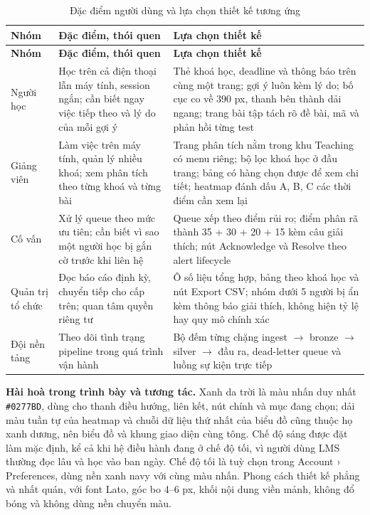{\small
\begin{longtable}{@{}L{2.0cm}L{5.4cm}L{7.4cm}@{}}
\caption{Đặc điểm người dùng và lựa chọn thiết kế tương ứng}\label{tab:ui-users}\\
\toprule
\textbf{Nhóm} & \textbf{Đặc điểm, thói quen} & \textbf{Lựa chọn thiết kế} \\
\midrule
\endfirsthead
\toprule
\textbf{Nhóm} & \textbf{Đặc điểm, thói quen} & \textbf{Lựa chọn thiết kế} \\
\midrule
\endhead
Người học & Học trên cả điện thoại lẫn máy tính, session ngắn; cần biết ngay việc tiếp theo và lý do của mỗi gợi ý & Thẻ khoá học, deadline và thông báo trên cùng một trang; gợi ý luôn kèm lý do; bố cục co về 390 px, thanh bên thành dải ngang; trang bài tập tách rõ đề bài, mã và phản hồi từng test \\
Giảng viên & Làm việc trên máy tính, quản lý nhiều khoá; xem phân tích theo từng khoá và từng bài & Trang phân tích nằm trong khu Teaching có menu riêng; bộ lọc khoá học ở đầu trang; bảng có hàng chọn được để xem chi tiết; heatmap đánh dấu A, B, C các thời điểm cần xem lại \\
Cố vấn & Xử lý queue theo mức ưu tiên; cần biết vì sao một người học bị gắn cờ trước khi liên hệ & Queue xếp theo điểm rủi ro; điểm phân rã thành 35 + 30 + 20 + 15 kèm câu giải thích; nút Acknowledge và Resolve theo alert lifecycle \\
Quản trị tổ chức & Đọc báo cáo định kỳ, chuyển tiếp cho cấp trên; quan tâm quyền riêng tư & Ô số liệu tổng hợp, bảng theo khoá học và nút Export CSV; nhóm dưới 5 người bị ẩn kèm thông báo giải thích, không hiện tỷ lệ hay quy mô chính xác \\
Đội nền tảng & Theo dõi tình trạng pipeline trong quá trình vận hành & Bộ đếm từng chặng ingest $\rightarrow$ bronze $\rightarrow$ silver $\rightarrow$ đầu ra, dead-letter queue và luồng sự kiện trực tiếp \\
\bottomrule
\end{longtable}}

\textbf{Hài hoà trong trình bày và tương tác.} Xanh da trời là màu nhấn duy nhất \texttt{\#0277BD}, dùng cho thanh điều hướng, liên kết, nút chính và mục đang chọn; dải màu tuần tự của heatmap và chuỗi dữ liệu thứ nhất của biểu đồ cũng thuộc họ xanh dương, nên biểu đồ và khung giao diện cùng tông. Chế độ sáng được đặt làm mặc định, kể cả khi hệ điều hành đang ở chế độ tối, vì người dùng LMS thường đọc lâu và học vào ban ngày. Chế độ tối là tuỳ chọn trong Account › Preferences, dùng nền xanh navy với cùng màu nhấn. Phong cách thiết kế phẳng và nhất quán, với font Lato, góc bo 4--6 px, khối nội dung viền mảnh, không đổ bóng và không dùng nền chuyển màu.

